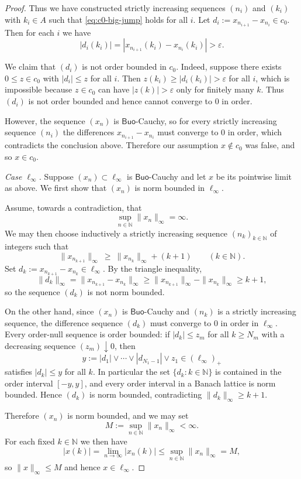 \documentclass[11pt]{amsart}
\theoremstyle{definition}
\newcommand{\N}{\mathbb{N}}
\newcommand{\Buo}{\ensuremath{\mathsf{Buo}}}
\renewcommand{\le}{\leqslant}
\renewcommand{\ge}{\geqslant}
\begin{document}
\begin{proof}
Thus we have constructed strictly increasing sequences $(n_i)$ and $(k_i)$
with $k_i\in A$ such that \eqref{eq:c0-big-jump} holds for all $i$.  Let
$d_i:=x_{n_{i+1}}-x_{n_i}\in c_0$.  Then for each $i$ we have
\[
|d_i(k_i)|=|x_{n_{i+1}}(k_i)-x_{n_i}(k_i)|>\varepsilon.
\]

We claim that $(d_i)$ is not order bounded in $c_0$.  Indeed, suppose there
exists $0\le z\in c_0$ with $|d_i|\le z$ for all $i$.  Then
$z(k_i)\ge |d_i(k_i)|>\varepsilon$ for all $i$, which is impossible because
$z\in c_0$ can have $|z(k)|>\varepsilon$ only for finitely many $k$.  Thus
$(d_i)$ is not order bounded and hence cannot converge to $0$ in order.

However, the sequence $(x_n)$ is \Buo-Cauchy, so for every strictly
increasing sequence $(n_i)$ the differences $x_{n_{i+1}}-x_{n_i}$
must converge to $0$ in order, which contradicts the conclusion above.
Therefore our assumption $x\notin c_0$ was false, and so $x\in c_0$.

\emph{Case $\ell_\infty$.}
Suppose $(x_n)\subset\ell_\infty$ is \Buo-Cauchy and let $x$ be its
pointwise limit as above.  We first show that $(x_n)$ is norm bounded in
$\ell_\infty$.

Assume, towards a contradiction, that
\[
\sup_{n\in\N}\|x_n\|_\infty=\infty.
\]
We may then choose inductively a strictly increasing sequence
$(n_k)_{k\in\N}$ of integers such that
\[
\|x_{n_{k+1}}\|_\infty \ \ge\ \|x_{n_k}\|_\infty + (k+1)
\qquad(k\in\N).
\]
Set $d_k:=x_{n_{k+1}}-x_{n_k}\in\ell_\infty$.  By the triangle inequality,
\[
\|d_k\|_\infty
=\|x_{n_{k+1}}-x_{n_k}\|_\infty
\ge \|x_{n_{k+1}}\|_\infty-\|x_{n_k}\|_\infty
\ge k+1,
\]
so the sequence $(d_k)$ is not norm bounded.

On the other hand, since $(x_n)$ is \Buo-Cauchy and $(n_k)$ is a strictly
increasing sequence, the difference sequence $(d_k)$ must converge to $0$
in order in $\ell_\infty$.  Every order-null sequence is order bounded: if
$|d_k|\le z_m$ for all $k\ge N_m$ with a decreasing sequence
$(z_m)\downarrow0$, then
\[
y:=|d_1|\vee\cdots\vee|d_{N_1-1}|\vee z_1\in(\ell_\infty)_+
\]
satisfies $|d_k|\le y$ for all $k$.  In particular the set
$\{d_k:k\in\N\}$ is contained in the order interval $[-y,y]$, and every
order interval in a Banach lattice is norm bounded.  Hence $(d_k)$ is norm
bounded, contradicting $\|d_k\|_\infty\ge k+1$.

Therefore $(x_n)$ is norm bounded, and we may set
\[
M:=\sup_{n\in\N}\|x_n\|_\infty<\infty.
\]
For each fixed $k\in\N$ we then have
\[
|x(k)|=\lim_{n\to\infty}|x_n(k)|
\le \sup_{n\in\N}\|x_n\|_\infty=M,
\]
so $\|x\|_\infty\le M$ and hence $x\in\ell_\infty$.
\end{proof}
\end{document}
